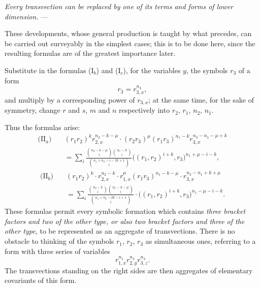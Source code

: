 \documentclass[10pt]{article}
\begin{document}
\emph{Every transvection can be replaced by one of its terms and forms of lower dimension.} ---

These developments, whose general production is taught by what precedes, can be carried out surveyably in the simplest cases; this is to be done here, since the resulting formulas are of the greatest importance later.

Substitute in the formulas (I$_b$) and (I$_c$), for the variables $y$, the symbols $r_3$ of a form
\[
r_3=r_{3,x}^{n_3},
\]
and multiply by a corresponding power of $r_{3,x}$; at the same time, for the sake of symmetry, change $r$ and $s$, $m$ and $n$ respectively into $r_2$, $r_1$, $n_2$, $n_1$.

Thus the formulas arise:
\[
\begin{aligned}
\text{(II$_a$)}\quad &(r_1r_2)^k r_{2,x}^{n_2-k-\mu}\cdot(r_2r_3)^\mu(r_1r_3)^{n_1-k}r_{3,x}^{n_3-n_1-\mu+k}\\
&=\sum_i\frac{\binom{n_2-k-\mu}{i}\binom{n_1-k}{i}}{\binom{n_1+n_2-i-2k+1}{i}}\bigl((r_1,r_2)^{i+k},r_3\bigr)^{n_1+\mu-i-k},
\end{aligned}
\]
\[
\begin{aligned}
\text{(II$_b$)}\quad &(r_1r_2)^k\cdot r_{2,x}^{n_2-k}\cdot r_{1,x}^{\mu}(r_1r_3)^{n_1-k-\mu}\cdot r_{3,x}^{n_3-n_1+k+\mu}\\
&=\sum_i\frac{\binom{n_2-k}{i}\binom{n_1-k-\mu}{i}}{\binom{n_1+n_2-2k-i+1}{i}}\cdot\bigl((r_1,r_2)^{i+k},r_3\bigr)^{n_1-\mu-i-k}.
\end{aligned}
\]
These formulas permit every symbolic formation which contains \emph{three bracket factors and two of the other type, or also two bracket factors and three of the other type}, to be represented as an aggregate of transvections. There is no obstacle to thinking of the symbols $r_1$, $r_2$, $r_3$ as simultaneous ones, referring to a form with three series of variables
\[
r_{1,x}^{n_1}r_{2,y}^{n_2}r_{3,z}^{n_3}.
\]
The transvections standing on the right sides are then aggregates of elementary covariants of this form.
\end{document}
